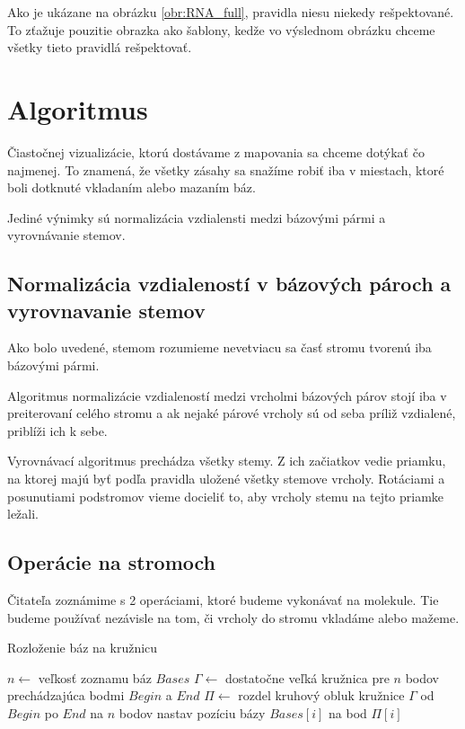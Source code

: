 Ako je ukázane na obrázku \ref{obr:RNA_full}, pravidla niesu niekedy rešpektované. To zťažuje pouzitie obrazka
ako šablony, kedže vo výslednom obrázku chceme všetky tieto pravidlá rešpektovať.

\section{Algoritmus}
Čiastočnej vizualizácie, ktorú dostávame z mapovania sa chceme dotýkať čo najmenej. To znamená,
že všetky zásahy sa snažíme robiť iba v miestach, ktoré boli dotknuté vkladaním alebo mazaním báz.

Jediné výnimky sú normalizácia vzdialensti medzi bázovými pármi a vyrovnávanie stemov.

\subsection{Normalizácia vzdialeností v bázových pároch a vyrovnavanie stemov}

Ako bolo uvedené, stemom rozumieme nevetviacu sa časť stromu tvorenú iba bázovými pármi.

Algoritmus normalizácie vzdialeností medzi vrcholmi bázových párov stojí iba v preiterovaní celého stromu
a ak nejaké párové vrcholy sú od seba príliž vzdialené, priblíži ich k sebe.

Vyrovnávací algoritmus prechádza všetky stemy. Z ich začiatkov vedie priamku, na ktorej majú byť podľa pravidla uložené
všetky stemove vrcholy. Rotáciami a posunutiami podstromov vieme docieliť to, aby vrcholy stemu na tejto priamke ležali.


\subsection{Operácie na stromoch}

Čitateľa zoznámime s 2 operáciami, ktoré budeme vykonávať na molekule. Tie budeme používať nezávisle
na tom, či vrcholy do stromu vkladáme alebo mažeme.

\begin{algorithm}
  \caption{Rozloženie báz na kružnicu}
  \label{alg:operácia_circle_reinsert}
  \begin{algorithmic}[1]
      \State $n \gets$ veľkosť zoznamu báz $Bases$
      \State $\Gamma \gets$ dostatočne veľká kružnica pre $n$ bodov prechádzajúca bodmi $Begin$ a $End$
      \State $\Pi \gets$ rozdel kruhový obluk kružnice $\Gamma$ od $Begin$ po $End$ na $n$ bodov
        \State nastav pozíciu bázy $Bases[i]$ na bod $\Pi[i]$
      \EndFor
    \EndProcedure
  \end{algorithmic}
\end{algorithm}


